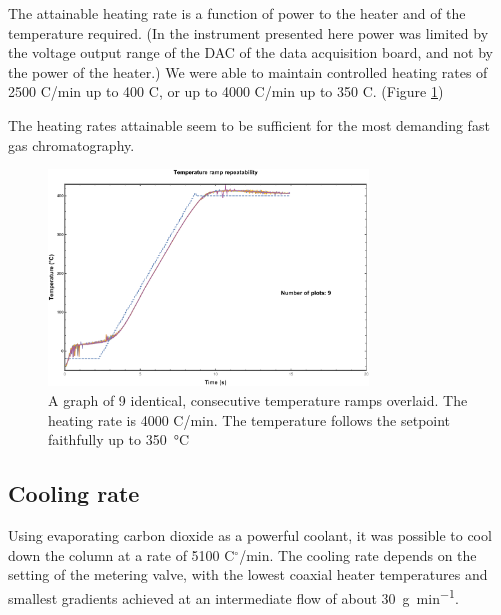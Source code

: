 \documentclass[aip,rsi,preprint,graphicx]{revtex4-1} %
\begin{document}
The attainable heating rate is a function of power to the heater and of the
temperature required. (In the instrument presented here power was limited by the
voltage output range of the DAC of the data acquisition board, and not by the
power of the heater.) We were able to maintain controlled heating rates of 
2500 C\textdegree /min up to 400 \textdegree C, or up to 4000 C\textdegree /min
up to 350 \textdegree C. (Figure \ref{fig:MaxHeatingRate})

The heating rates attainable seem to be sufficient for the most demanding fast
gas chromatography.

\begin{figure}
\includegraphics[width=8.5cm]{./Figures/high_rate_heating.pdf}%

\caption{\label{fig:MaxHeatingRate}A graph of 9 identical, consecutive temperature ramps overlaid. 
The heating rate is 4000 C\textdegree /min. The temperature follows the setpoint faithfully up to \SI{350}{\celsius}}

\end{figure}

\subsection{Cooling rate}

Using evaporating carbon dioxide as a powerful coolant, it was possible to cool
down the column at a rate of 5100 C$^\circ$/min. The cooling rate depends on the
setting of the metering valve, with the lowest coaxial heater temperatures and
smallest gradients achieved at an intermediate flow of about
\SI{30}{\gram\per\minute}.

\end{document}
